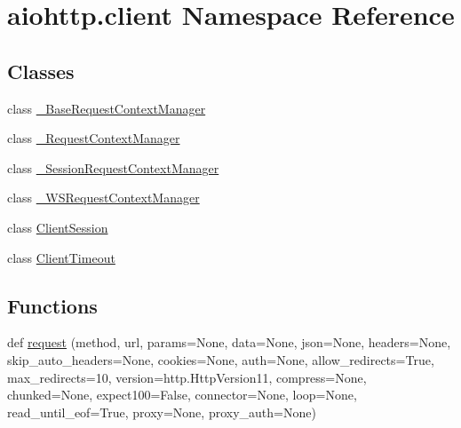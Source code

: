 \hypertarget{namespaceaiohttp_1_1client}{}\section{aiohttp.\+client Namespace Reference}
\label{namespaceaiohttp_1_1client}
\subsection*{Classes}
\begin{DoxyCompactItemize}
\item 
class \hyperlink{classaiohttp_1_1client_1_1___base_request_context_manager}{\+\_\+\+Base\+Request\+Context\+Manager}
\item 
class \hyperlink{classaiohttp_1_1client_1_1___request_context_manager}{\+\_\+\+Request\+Context\+Manager}
\item 
class \hyperlink{classaiohttp_1_1client_1_1___session_request_context_manager}{\+\_\+\+Session\+Request\+Context\+Manager}
\item 
class \hyperlink{classaiohttp_1_1client_1_1___w_s_request_context_manager}{\+\_\+\+W\+S\+Request\+Context\+Manager}
\item 
class \hyperlink{classaiohttp_1_1client_1_1_client_session}{Client\+Session}
\item 
class \hyperlink{classaiohttp_1_1client_1_1_client_timeout}{Client\+Timeout}
\end{DoxyCompactItemize}
\subsection*{Functions}
\begin{DoxyCompactItemize}
\item 
def \hyperlink{namespaceaiohttp_1_1client_ab0f1d0a5569ca9cc2986e7e43380c049}{request} (method, url, params=None, data=None, json=None, headers=None, skip\+\_\+auto\+\_\+headers=None, cookies=None, auth=None, allow\+\_\+redirects=True, max\+\_\+redirects=10, version=http.\+Http\+Version11, compress=None, chunked=None, expect100=False, connector=None, loop=None, read\+\_\+until\+\_\+eof=True, proxy=None, proxy\+\_\+auth=None)
\end{DoxyCompactItemize}
